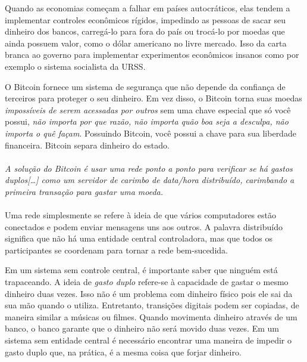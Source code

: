 Quando as economias começam a falhar em países autocráticos, elas tendem a implementar controles econômicos rígidos, impedindo as pessoas de sacar seu dinheiro dos bancos, carregá-lo para fora do país ou trocá-lo por moedas que ainda possuem valor, como o dólar americano no livre mercado.
Isso da carta branca ao governo para implementar experimentos econômicos insanos como por exemplo o sistema socialista da URSS.

O Bitcoin fornece um sistema de segurança que não depende da confiança de terceiros para proteger o seu dinheiro. Em vez disso, o Bitcoin torna suas moedas \textit{impossíveis de serem acessadas por outros} sem uma chave especial que só você possui, \textit{não importa por que razão, não importa quão boa seja a desculpa, não importa o quê façam}. Possuindo Bitcoin, você possui a chave para sua liberdade financeira. Bitcoin separa dinheiro do estado.


\paragraph{}
\textit{A solução do Bitcoin é usar uma rede ponto a ponto para verificar se há gastos duplos[\ldots] como um servidor de carimbo de data/hora distribuído, carimbando a primeira transação para gastar uma moeda.}
\paragraph{}

Uma rede simplesmente se refere à ideia de que vários computadores estão conectados e podem enviar mensagens uns aos outros. A palavra distribuído significa que não há uma entidade central controladora, mas que todos os participantes se coordenam para tornar a rede bem-sucedida.

Em um sistema sem controle central, é importante saber que ninguém está trapaceando. A ideia de \textit{gasto duplo} refere-se à capacidade de gastar o mesmo dinheiro duas vezes. Isso não é um problema com dinheiro físico pois ele sai da sua mão quando o utiliza. Entretanto, transições digitais podem ser copiadas, de maneira similar a músicas ou filmes. Quando movimenta dinheiro através de um banco, o banco garante que o dinheiro não será movido duas vezes. Em um sistema sem entidade central é necessário encontrar uma maneira de impedir o gasto duplo que, na prática, é a mesma coisa que forjar dinheiro.


